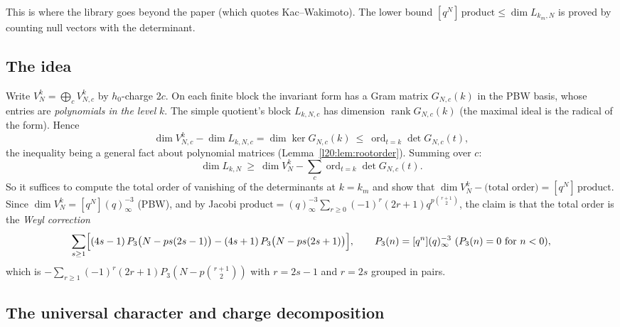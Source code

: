 This is where the library goes beyond the paper (which quotes Kac--Wakimoto). The lower bound
$[q^N]\,\mathrm{product}\le\dim L_{k_m,N}$ is proved by counting null vectors with the determinant.

\subsection{The idea}

Write $V^k_N=\bigoplus_cV^k_{N,c}$ by $h_0$-charge $2c$. On each finite block the invariant form has a Gram matrix
$G_{N,c}(k)$ in the PBW basis, whose entries are \emph{polynomials in the level} $k$. The simple quotient's block
$L_{k,N,c}$ has dimension $\operatorname{rank}G_{N,c}(k)$ (the maximal ideal is the radical of the form). Hence
\begin{equation}\label{l20:eq:rank}
\dim V^k_{N,c}-\dim L_{k,N,c}=\dim\ker G_{N,c}(k)\ \le\ \operatorname{ord}_{t=k}\det G_{N,c}(t),
\end{equation}
the inequality being a general fact about polynomial matrices (Lemma~\ref{l20:lem:rootorder}). Summing over $c$:
\begin{equation*}
\dim L_{k,N}\ \ge\ \dim V^k_N-\sum_c\operatorname{ord}_{t=k}\det G_{N,c}(t).
\end{equation*}
So it suffices to compute the total order of vanishing of the determinants at $k=k_m$ and show that
$\dim V^k_N-\text{(total order)}=[q^N]\,\mathrm{product}$. Since $\dim V^k_N=[q^N](q)_\infty^{-3}$ (PBW), and by
Jacobi $\mathrm{product}=(q)_\infty^{-3}\sum_{r\ge0}(-1)^r(2r+1)q^{p\binom{r+1}2}$, the claim is that the total order
is the \emph{Weyl correction}
\begin{equation}\label{l20:eq:weyl}
\sum_{s\ge1}\Bigl[(4s-1)\,P_3\bigl(N-ps(2s-1)\bigr)-(4s+1)\,P_3\bigl(N-ps(2s+1)\bigr)\Bigr],\qquad
P_3(n)=[q^n](q)^{-3}_\infty\ (P_3(n)=0\text{ for }n<0),
\end{equation}
which is $-\sum_{r\ge1}(-1)^r(2r+1)P_3(N-p\binom{r+1}2)$ with $r=2s-1$ and $r=2s$ grouped in pairs.

\subsection{The universal character and charge decomposition}


